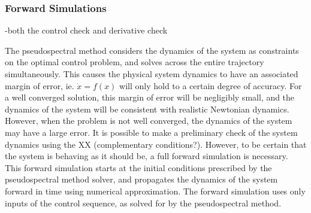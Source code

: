 \subsubsection{Forward Simulations}
-both the control check and derivative check

The pseudospectral method considers the dynamics of the system as constraints on the optimal control problem, and solves across the entire trajectory simultaneously. This causes the physical system dynamics to have an associated margin of error, ie. $\dot{x} = f(x)$ will only hold to a certain degree of accuracy. For a well converged solution, this margin of error will be negligibly small, and the dynamics of the system will be consistent with realistic Newtonian dynamics. However, when the problem is not well converged, the dynamics of the system may have a large error. It is possible to make a preliminary check of the system dynamics using the XX (complementary conditions?). However, to be certain that the system is behaving as it should be, a full forward simulation is necessary. This forward simulation starts at the initial conditions prescribed by the pseudospectral method solver, and propagates the dynamics of the system forward in time using numerical approximation. The forward simulation uses only inputs of the control sequence, as solved for by the pseudospectral method. 
